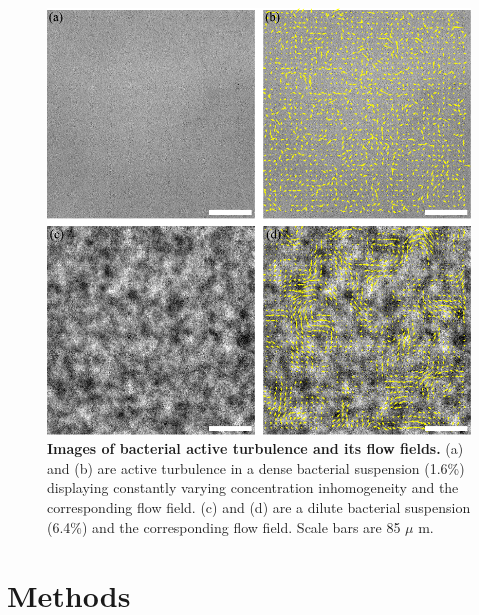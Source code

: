 \begin{figure}[htbp]
\begin{center}
\includegraphics[width=5.5in]{figs/5-GNF/1.pdf}
\caption[Images of bacterial active turbulence and its flow fields]
{
\textbf{Images of bacterial active turbulence and its flow fields.}
(a) and (b) are active turbulence in a dense bacterial suspension (1.6\%) displaying constantly varying concentration inhomogeneity and the corresponding flow field.
(c) and (d) are a dilute bacterial suspension (6.4\%) and the corresponding flow field.
Scale bars are 85 $\mu$ m.
}
\label{fig:experiment}
\end{center}
\end{figure}


\section{Methods}

